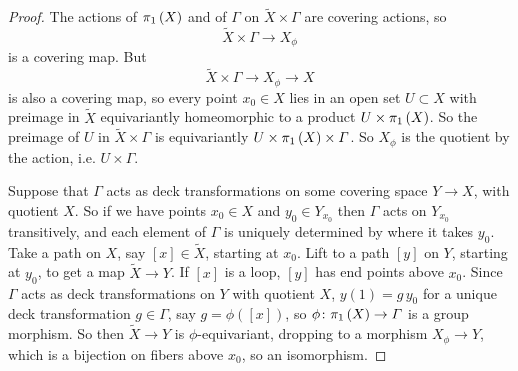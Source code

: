 \begin{proof}
The actions of \(\pi_{1}\left(X\right)\) and of \(\Gamma\) on \(\tilde{X} \times \Gamma\) are covering actions, so 
\[
\tilde{X} \times \Gamma \to X_{\phi}
\]
is a covering map.
But 
\[
\tilde{X} \times \Gamma \to X_{\phi} \to X
\]
is also a covering map, so every point \(x_0 \in X\) lies in an open set \(U \subset X\) with preimage in \(\tilde{X}\) equivariantly homeomorphic to a product \(U \times \pi_{1}\left(X\right)\).
So the preimage of \(U\) in \(\tilde{X}\times \Gamma\) is equivariantly \(U \times \pi_{1}\left(X\right) \times \Gamma\).
So \(X_{\phi}\) is the quotient by the action, i.e. \(U \times \Gamma\).

Suppose that \(\Gamma\) acts as deck transformations on some covering space \(Y \to X\), with quotient \(X\).
So if we have points \(x_0 \in X\) and \(y_0 \in Y_{x_0}\) then \(\Gamma\) acts on \(Y_{x_0}\) transitively, and each element of \(\Gamma\) is uniquely determined by where it takes \(y_0\).
Take a path on \(X\), say \([x] \in \tilde{X}\), starting at \(x_0\).
Lift to a path \([y]\) on \(Y\), starting at \(y_0\), to get a map \(\tilde{X} \to Y\).
If \([x]\) is a loop, \([y]\) has end points above \(x_0\).
Since \(\Gamma\) acts as deck transformations on \(Y\) with quotient \(X\), \(y(1)=g \, y_0\) for a unique deck transformation \(g \in \Gamma\), say \(g=\phi([x])\), so \(\phi \colon \pi_{1}\left(X\right) \to \Gamma\) is a group morphism.
So then \(\tilde{X} \to Y\) is \(\phi\)-equivariant, dropping to a morphism \(X_{\phi} \to Y\), which is a bijection on fibers above \(x_0\), so an isomorphism.
\end{proof}

